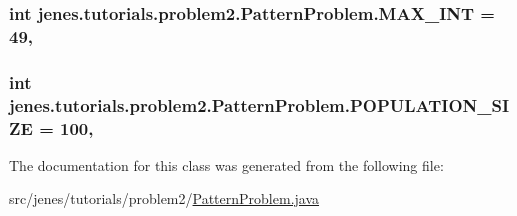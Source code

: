 \hypertarget{classjenes_1_1tutorials_1_1problem2_1_1_pattern_problem_afe5dfaf22b9bb517a24c95b3101b3e0d}{
\subsubsection[{M\-A\-X\-\_\-\-I\-N\-T}]{\setlength{\rightskip}{0pt plus 5cm}int jenes.\-tutorials.\-problem2.\-Pattern\-Problem.\-M\-A\-X\-\_\-\-I\-N\-T = 49\hspace{0.3cm}{\ttfamily [static]}, {\ttfamily [private]}}}\label{classjenes_1_1tutorials_1_1problem2_1_1_pattern_problem_afe5dfaf22b9bb517a24c95b3101b3e0d}
\hypertarget{classjenes_1_1tutorials_1_1problem2_1_1_pattern_problem_a472c770e5238935d4495ede668dc019c}{
\subsubsection[{P\-O\-P\-U\-L\-A\-T\-I\-O\-N\-\_\-\-S\-I\-Z\-E}]{\setlength{\rightskip}{0pt plus 5cm}int jenes.\-tutorials.\-problem2.\-Pattern\-Problem.\-P\-O\-P\-U\-L\-A\-T\-I\-O\-N\-\_\-\-S\-I\-Z\-E = 100\hspace{0.3cm}{\ttfamily [static]}, {\ttfamily [private]}}}\label{classjenes_1_1tutorials_1_1problem2_1_1_pattern_problem_a472c770e5238935d4495ede668dc019c}


The documentation for this class was generated from the following file\-:\begin{DoxyCompactItemize}
\item 
src/jenes/tutorials/problem2/\hyperlink{problem2_2_pattern_problem_8java}{Pattern\-Problem.\-java}\end{DoxyCompactItemize}
